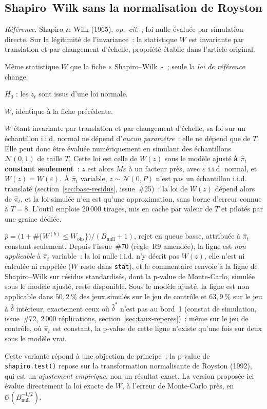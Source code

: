 \documentclass[a4paper,11pt]{article}
\newcommand{\code}[1]{\texttt{\small #1}}
\newcommand{\refl}[1]{{\small\textcolor{maincolor!70!black}{\textit{Référence.} #1}}\par\smallskip}
\newcounter{ficheid}
\newenvironment{fiche}[1]{%
  \stepcounter{ficheid}%
  \phantomsection
  \subsection{#1}%
  \label{fiche:\theficheid}%
}{%
  \end{description}\vspace{0.5em}%
}
\newcommand{\Cadre}{%
  \begin{description}[leftmargin=0pt, style=unboxed, itemsep=3pt, topsep=3pt, parsep=2pt]%
  \item[\textcolor{financeblue}{\textbf{1. Cadre, notations et hypothèses de validité (non testées).}}]}
\newcommand{\Hzero}{\item[\textcolor{financeblue}{\textbf{2. Hypothèse nulle.}}]}
\newcommand{\Stat}{\item[\textcolor{financeblue}{\textbf{3. Statistique de test.}}]}
\newcommand{\Loi}{\item[\textcolor{financeblue}{\textbf{4. Loi sous $H_0$.}}]}
\newcommand{\Pval}{\item[\textcolor{financeblue}{\textbf{5. p-value.}}]}
\newcommand{\Usage}{\item[\textcolor{financeblue}{\textbf{6. Usage et limites.}}]}
\begin{document}
\begin{fiche}{Shapiro--Wilk sans la normalisation de Royston}
\label{fiche:shapiro-wilk-sans-royston}%
\refl{Shapiro \& Wilk (1965), \emph{op.\ cit.} ; loi nulle évaluée par simulation directe.
Sur la légitimité de l'invariance~: la statistique $W$ est invariante par translation et par
changement d'échelle, propriété établie dans l'article original.}
\Cadre
Même statistique $W$ que la fiche « Shapiro--Wilk »~; seule la \emph{loi de référence} change.
\Hzero
$H_0$ : les $z_t$ sont issus d'une loi normale.
\Stat
$W$, identique à la fiche précédente.
\Loi
$W$ étant invariante par translation et par changement d'échelle, sa loi sur un échantillon
i.i.d. normal ne dépend d'\emph{aucun paramètre}~: elle ne dépend que de $T$. Elle peut donc être
évaluée numériquement en simulant des échantillons $\mathcal{N}(0,1)$ de taille $T$. Cette loi
est celle de $W(z)$ sous le modèle ajusté \textbf{à $\hat\pi_t$ constant seulement}~: $z$ est
alors $M\varepsilon$ à un facteur près, avec $\varepsilon$ i.i.d. normal, et $W(z) = W(\varepsilon)$.
À $\hat\pi_t$ variable, $z \sim \mathcal{N}(0, P)$ n'est pas un échantillon i.i.d. translaté
(section~\ref{sec:base-residus}, issue~\#25)~: la loi de $W(z)$ dépend alors de $\hat\pi_t$, et la
loi simulée n'en est qu'une approximation, sans borne d'erreur connue à $T = 8$. L'outil emploie
20\,000 tirages, mis en cache par valeur de $T$ et pilotés par une graine dédiée.
\Pval
$\hat p = \big(1 + \#\{W^{(b)} \le W_{\text{obs}}\}\big) / (B_{\text{null}} + 1)$, rejet en queue
basse, attribuée à $\hat\pi_t$ constant seulement. Depuis l'issue~\#70 (règle~R9 amendée), la
ligne est \emph{non applicable} à $\hat\pi_t$ variable~: la loi nulle i.i.d. n'y décrit pas $W(z)$,
elle n'est ni calculée ni rappelée ($W$ reste dans \code{stat}), et le commentaire renvoie à la
ligne de Shapiro--Wilk sur résidus standardisés, dont la p-value de Monte-Carlo, simulée sous le
modèle ajusté, reste disponible. Sous le modèle ajusté, la ligne est non applicable dans $50{,}2~\%$
des jeux simulés sur le jeu de contrôle et $63{,}9~\%$ sur le jeu à $\hat\delta$ intérieur,
exactement ceux où $\hat\delta^{*}$ n'est pas au bord~1 (constat de simulation, issue~\#72,
2\,000 réplications, section~\ref{sec:taux-reperes})~: même sur le jeu de contrôle, où
$\hat\pi_t$ est constant, la p-value de cette ligne n'existe qu'une fois sur deux sous le modèle
vrai.
\Usage
Cette variante répond à une objection de principe~: la p-value de \code{shapiro.test()} repose sur
la transformation normalisante de Royston (1992), qui est un \emph{ajustement empirique}, non un
résultat exact. La version proposée ici évalue directement la loi exacte de $W$, à l'erreur de
Monte-Carlo près, en $\mathcal{O}(B_{\text{null}}^{-1/2})$.


\end{fiche}
\end{document}
